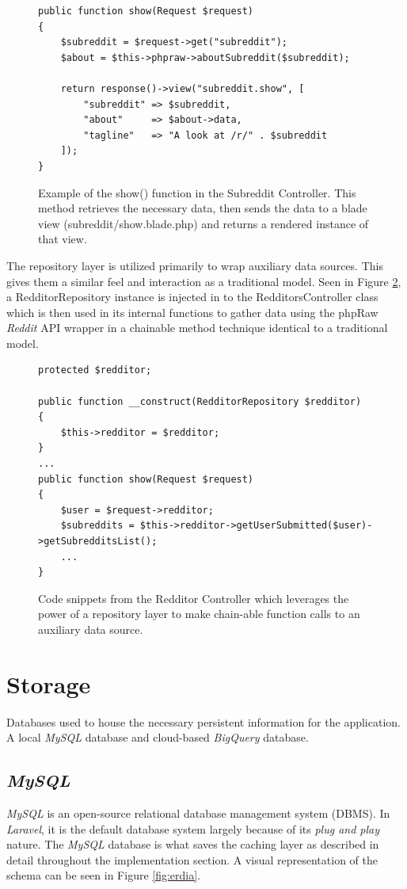 \documentclass[msc,oneside]{ubcthesis}%
\begin{document}
\begin{figure}[H]
\begin{lstlisting}
public function show(Request $request)
{
	$subreddit = $request->get("subreddit");
	$about = $this->phpraw->aboutSubreddit($subreddit);
	
	return response()->view("subreddit.show", [
		"subreddit" => $subreddit,
		"about"     => $about->data,
		"tagline"   => "A look at /r/" . $subreddit
	]);
}
\end{lstlisting}
\caption[Example of Controller]{
Example of the show() function in the Subreddit Controller. This method retrieves the necessary data, then sends the data to a blade view (subreddit/show.blade.php) and returns a rendered instance of that view.}
\label{fig:contex}
\end{figure}

The repository layer is utilized primarily to wrap auxiliary data sources. This gives them a similar feel and interaction as a traditional model. Seen in Figure \ref{fig:repository}, a RedditorRepository instance is injected in to the RedditorsController class which is then used in its internal functions to gather data using the phpRaw \textit{Reddit} API wrapper in a chainable method technique identical to a traditional model.
\begin{figure}[!htb]
\begin{lstlisting}
protected $redditor;

public function __construct(RedditorRepository $redditor)
{
	$this->redditor = $redditor;
}
...
public function show(Request $request)
{
	$user = $request->redditor;
	$subreddits = $this->redditor->getUserSubmitted($user)->getSubredditsList();
	...
}
\end{lstlisting}
\caption[Example of Repository]{
Code snippets from the Redditor Controller which leverages the power of a repository layer to make chain-able function calls to an auxiliary data source.}
\label{fig:repository}
\end{figure}

\section{Storage}
Databases used to house the necessary persistent information for the application. A local \textit{MySQL} database and cloud-based \textit{BigQuery} database.

\subsection{\textit{MySQL}}
\textit{MySQL} is an open-source relational database management system (DBMS). In \textit{Laravel}, it is the default database system largely because of its \textit{plug and play} nature. The \textit{MySQL} database is what saves the caching layer as described in detail throughout the implementation section. A visual representation of the schema can be seen in Figure \ref{fig:erdia}.
\end{document}
